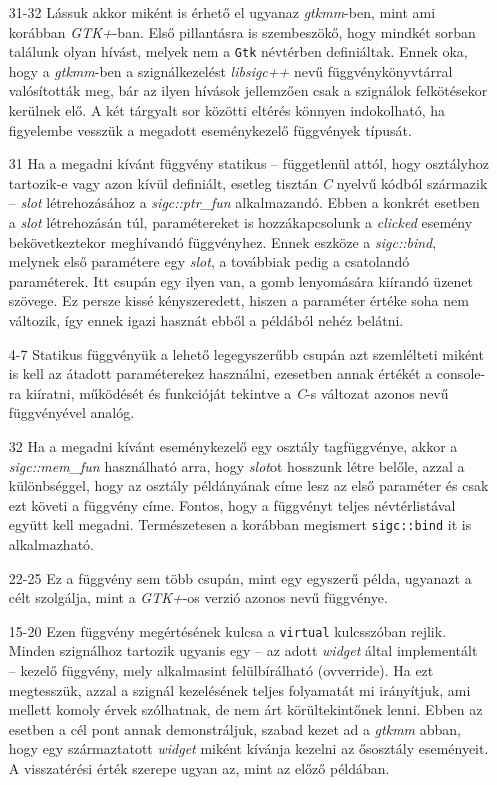 \begin{enumerate}
 \item[31-32] Lássuk akkor miként is érhető el ugyanaz \textit{gtkmm}-ben, mint ami korábban \textit{GTK+}-ban. Első pillantásra is szembeszökő, hogy mindkét sorban találunk olyan hívást, melyek nem a \texttt{Gtk} névtérben definiáltak. Ennek oka, hogy a \textit{gtkmm}-ben a szignálkezelést \textit{libsigc++} nevű függvénykönyvtárral valósították meg, bár az ilyen hívások jellemzően csak a szignálok felkötésekor kerülnek elő. A két tárgyalt sor közötti eltérés könnyen indokolható, ha figyelembe vesszük a megadott eseménykezelő függvények típusát.

 \item[31] Ha a megadni kívánt függvény statikus -- függetlenül attól, hogy osztályhoz tartozik-e vagy azon kívül definiált, esetleg tisztán \textit{C} nyelvű kódból származik -- \textit{slot} létrehozásához a \textit{sigc::ptr\_fun} alkalmazandó. Ebben a konkrét esetben a \textit{slot} létrehozásán túl, paramétereket is hozzákapcsolunk a \textit{clicked} esemény bekövetkeztekor meghívandó függvényhez. Ennek eszköze a \textit{sigc::bind}, melynek első paramétere egy \textit{slot}, a továbbiak pedig a csatolandó paraméterek. Itt csupán egy ilyen van, a gomb lenyomására kiírandó üzenet szövege. Ez persze kissé kényszeredett, hiszen a paraméter értéke soha nem változik, így ennek igazi hasznát ebből a példából nehéz belátni.

 \item[4-7] Statikus függvényük a lehető legegyszerűbb csupán azt szemlélteti miként is kell az átadott paraméterekez használni, ezesetben annak értékét a console-ra kiíratni, működését és funkcióját tekintve a \textit{C}-s változat azonos nevű függvényével analóg.

 \item[32] Ha a megadni kívánt eseménykezelő egy osztály tagfüggvénye, akkor a \textit{sigc::mem\_fun} használható arra, hogy \textit{slot}ot hosszunk létre belőle, azzal a különbséggel, hogy az osztály példányának címe lesz az első paraméter és csak ezt követi a függvény címe. Fontos, hogy a függvényt teljes névtérlistával együtt kell megadni. Természetesen a korábban megismert \texttt{sigc::bind} it is alkalmazható.

 \item[22-25] Ez a függvény sem több csupán, mint egy egyszerű példa, ugyanazt a célt szolgálja, mint a \textit{GTK+}-os verzió azonos nevű függvénye.

 \item[15-20] Ezen függvény megértésének kulcsa a \texttt{virtual} kulcsszóban rejlik. Minden szignálhoz tartozik ugyanis egy -- az adott \textit{widget} által implementált -- kezelő függvény, mely alkalmasint felülbírálható (ovverride). Ha ezt megtesszük, azzal a szignál kezelésének teljes folyamatát mi irányítjuk, ami mellett komoly érvek szólhatnak, de nem árt körültekintőnek lenni. Ebben az esetben a cél pont annak demonstráljuk, szabad kezet ad a \textit{gtkmm} abban, hogy egy származtatott \textit{widget} miként kívánja kezelni az ősosztály eseményeit. A visszatérési érték szerepe ugyan az, mint az előző példában.
\end{enumerate}

